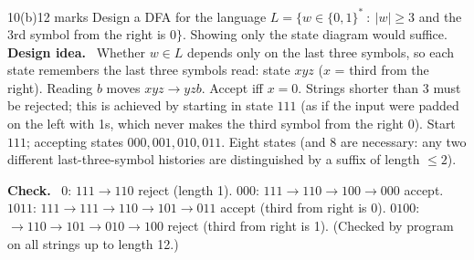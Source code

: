 \documentclass[10.5pt,a4paper]{article}
\newcommand{\ansh}[1]{\textbf{\color{exborder}#1}\ }
\begin{document}
\begin{qa}{10(b)}{12 marks}
Design a DFA for the language $L=\{w\in\{0,1\}^*\ :\ |w|\ge3$ and the 3rd symbol from the right is $0\}$. Showing only the state diagram would suffice.
\tcblower
\ansh{Design idea.} Whether $w\in L$ depends only on the last three symbols, so each state remembers the last three symbols read: state $xyz$
($x$ = third from the right). Reading $b$ moves $xyz\to yzb$. Accept iff $x=0$. Strings shorter than 3 must be rejected; this is achieved by
starting in state $111$ (as if the input were padded on the left with 1s, which never makes the third symbol from the right 0).
Start $111$; accepting states $000,001,010,011$. Eight states (and 8 are necessary: any two different last-three-symbol histories are
distinguished by a suffix of length $\le2$).
\begin{center}
\end{center}
\ansh{Check.} $0$: $111\to110$ reject (length 1). $000$: $111\to110\to100\to000$ accept. $1011$: $111\to111\to110\to101\to011$ accept (third from
right is 0). $0100$: $\to110\to101\to010\to100$ reject (third from right is 1). (Checked by program on all strings up to length 12.)
\end{qa}
\end{document}
